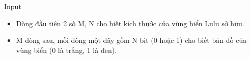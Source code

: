 Input
\begin{itemize}
	\item     Dòng đầu tiên 2 số M, N cho biết kích thước của vùng biển Lulu sở hữu.   
	\item     M dòng sau, mỗi dòng một dãy gồm N bit (0 hoặc 1) cho biết bản đồ của vùng biển (0 là trắng, 1 là đen).   
\end{itemize}